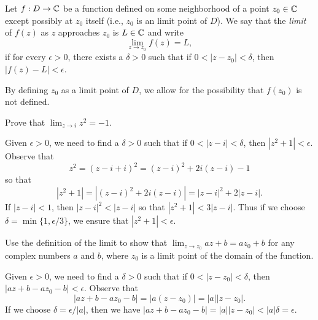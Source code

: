 \begin{definition}
    Let \(f : D \to \mathbb{C}\) be a function defined on some neighborhood of a point \(z_0 \in \mathbb{C}\) except possibly at \(z_0\) itself (i.e., \(z_0\) is an limit point of \(D\)). We say that the \emph{limit} of \(f(z)\) as \(z\) approaches \(z_0\) is \(L \in \mathbb{C}\) and write
    \[
        \lim_{z \to z_0} f(z) = L,
    \]
    if for every \(\epsilon > 0\), there exists a \(\delta > 0\) such that if \(0 < |z - z_0| < \delta\), then \(|f(z) - L| < \epsilon\).
    \label{def:limit}
\end{definition}

By defining \(z_0\) as a limit point of \(D\), we allow for the possibility that \(f(z_0)\) is not defined.

\begin{example}
    Prove that \(\displaystyle\lim_{z \to i} z^2 = -1\).
    \begin{solution}
        Given \(\epsilon > 0\), we need to find a \(\delta > 0\) such that if \(0 < |z - i| < \delta\), then \(|z^2 + 1| < \epsilon\). Observe that
        \begin{equation*}
            z^2 = (z - i + i)^2 = (z - i)^2 + 2i(z - i) - 1
        \end{equation*}
        so that
        \begin{equation*}
            |z^2 + 1| = |(z - i)^2 + 2i(z - i)| = |z - i|^2 + 2|z - i|.
        \end{equation*}
        If \(|z - i| < 1\), then \(|z - i|^2 < |z - i|\) so that \(|z^2 + 1| < 3|z - i|\). Thus if we choose \(\delta = \min\{1, \epsilon/3\}\), we ensure that \(|z^2 + 1| < \epsilon\).
    \end{solution}
\end{example}

\begin{example}
    Use the definition of the limit to show that \(\lim_{z \to z_0} az + b = az_0 + b\) for any complex numbers \(a\) and \(b\), where \(z_0\) is a limit point of the domain of the function.

    \begin{solution}
        Given \(\epsilon > 0\), we need to find a \(\delta > 0\) such that if \(0 < |z - z_0| < \delta\), then \(|az + b - az_0 - b| < \epsilon\). Observe that
        \[
            |az + b - az_0 - b| = |a(z - z_0)| = |a||z - z_0|.
        \]
        If we choose \(\delta = \epsilon/|a|\), then we have \(|az + b - az_0 - b| = |a||z - z_0| < |a|\delta = \epsilon\).
    \end{solution}
\end{example}

